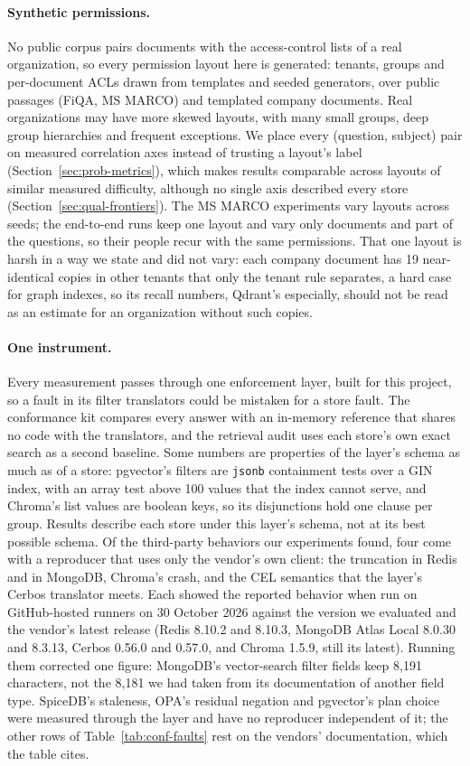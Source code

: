 \paragraph{Synthetic permissions.}
No public corpus pairs documents with the access-control lists of a real organization, so every
permission layout here is generated: tenants, groups and per-document ACLs drawn from templates and
seeded generators, over public passages (FiQA, MS MARCO) and templated company documents. Real
organizations may have more skewed layouts, with many small groups, deep group hierarchies and
frequent exceptions. We place every (question, subject) pair on measured correlation axes instead of
trusting a layout's label (Section~\ref{sec:prob-metrics}), which makes results comparable across
layouts of similar measured difficulty, although no single axis described every store
(Section~\ref{sec:qual-frontiers}). The MS MARCO experiments vary layouts across seeds; the
end-to-end runs keep one layout and vary only documents and part of the questions, so their people recur with the
same permissions. That one layout is harsh in a way we state and did not vary: each company document
has 19 near-identical copies in other tenants that only the tenant rule separates, a hard case for
graph indexes, so its recall numbers, Qdrant's especially, should not be read as an estimate for an
organization without such copies.

\paragraph{One instrument.}
Every measurement passes through one enforcement layer, built for this project, so a fault in its
filter translators could be mistaken for a store fault. The conformance kit compares every answer
with an in-memory reference that shares no code with the translators, and the retrieval audit uses
each store's own exact search as a second baseline. Some numbers are properties of the layer's schema
as much as of a store: pgvector's filters are \texttt{jsonb} containment tests over a GIN index, with an
array test above 100 values that the index cannot serve, and Chroma's list values are boolean keys, so
its disjunctions hold one clause per group. Results describe each store under this layer's schema, not
at its best possible schema. Of the third-party behaviors our experiments found, four come with a
reproducer that uses only the vendor's own client: the truncation in Redis and in MongoDB, Chroma's
crash, and the CEL semantics that the layer's Cerbos translator meets. Each showed the reported
behavior when run on GitHub-hosted runners on 30 October 2026 against the version we evaluated and the
vendor's latest release (Redis 8.10.2 and 8.10.3, MongoDB Atlas Local 8.0.30 and 8.3.13, Cerbos 0.56.0
and 0.57.0, and Chroma 1.5.9, still its latest). Running them corrected one figure: MongoDB's
vector-search filter fields keep 8,191 characters, not the 8,181 we had taken from its documentation
of another field type. SpiceDB's staleness, OPA's residual negation and pgvector's plan choice were
measured through the layer and have no reproducer independent of it; the other rows of
Table~\ref{tab:conf-faults} rest on the vendors' documentation, which the table cites.

